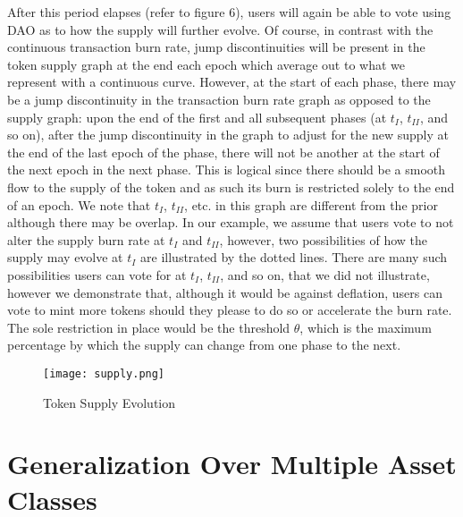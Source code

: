 \documentclass[12pt]{article}
\begin{document}
    \vspace{0.15cm}
    \indent
    After this period elapses (refer to figure 6), users will again be able to vote using DAO as to how the supply will further evolve. Of course, in contrast with the continuous transaction burn rate, jump discontinuities will be present in the token supply graph at the end each epoch which average out to what we represent with a continuous curve. However, at the start of each phase, there may be a jump discontinuity in the transaction burn rate graph as opposed to the supply graph: upon the end of the first and all subsequent phases (at \emph{$t_{I}$}, \emph{$t_{II}$}, and so on), after the jump discontinuity in the graph to adjust for the new supply at the end of the last epoch of the phase, there will not be another at the start of the next epoch in the next phase. This is logical since there should be a smooth flow to the supply of the token and as such its burn is restricted solely to the end of an epoch. We note that \emph{$t_{I}$}, \emph{$t_{II}$}, etc. in this graph are different from the prior although there may be overlap. In our example, we assume that users vote to not alter the supply burn rate at \emph{$t_{I}$} and \emph{$t_{II}$}, however, two possibilities of how the supply may evolve at \emph{$t_{I}$} are illustrated by the dotted lines. There are many such possibilities users can vote for at \emph{$t_{I}$}, \emph{$t_{II}$}, and so on, that we did not illustrate, however we demonstrate that, although it would be against deflation, users can vote to mint more tokens should they please to do so or accelerate the burn rate. The sole restriction in place would be the threshold \(\theta\), which is the maximum percentage by which the supply can change from one phase to the next. \par
    
    \vspace{1cm}
    
    \begin{figure}[!htb]
        \centering
        \texttt{[image: supply.png]}
        \caption{Token Supply Evolution}
        \label{fig:my_label}
    \end{figure}
    
    \pagebreak
    
\section{Generalization Over Multiple Asset Classes}
\end{document}
